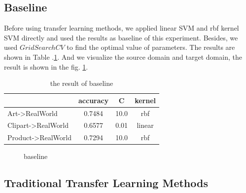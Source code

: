 \documentclass[conference]{IEEEtran}
\begin{document}
\subsection{Baseline}
Before using transfer learning methods, we applied linear SVM and rbf kernel SVM directly and used the results as baseline of this experiment. Besides, we used $GridSearchCV$ to find the optimal value of parameters. The results are shown in Table .\ref{tab:base}. And we visualize the source domain and target domain, the result is shown in the fig. \ref{fig:base}.

\begin{table}[htbp]
	\centering
	\caption{the result of baseline}
\begin{tabular}{|l|c|c|c|}
	\hline
	\diagbox{dataset}{result} & accuracy & C & kernel \\
	\hline
	Art->RealWorld & 0.7484  & 10.0 & rbf \\
	\hline
	Clipart->RealWorld & 0.6577 & 0.01 & linear \\
	\hline
	Product->RealWorld & 0.7294 & 10.0 & rbf \\
	\hline
\end{tabular}\label{tab:base}
\end{table}

\begin{center}
	\begin{figure}[htbp]
		\centering
		\quad
		\quad
		\caption{baseline}
		\label{fig:base}
	\end{figure}
\end{center}

\subsection{Traditional Transfer Learning Methods}
\end{document}
